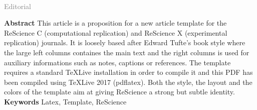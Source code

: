 \documentclass[a4paper,10pt]{article}
\makeatletter
\def\maketitle{{%
  \renewenvironment{tabular}[2][]
    {\begin{flushleft}}
    {\end{flushleft}}
  \AB@maketitle}}
\makeatother
\begin{document}
~\\
{\sf \large \textcolor{gray}{Editorial}}

{\let\newpage\relax\maketitle}
\maketitle

{\sf \bfseries Abstract} This article is a proposition for a new
article template for the ReScience C (computational replication) and ReScience
X (experimental replication) journals. It is loosely based after Edward Tufte's
book style where the large left columns containes the main text and the right
columns is used for auxiliary informations such as notes, captions or
references. The template requires a standard TeXLive installation in order to
compile it and this PDF has been compiled using TeXLive 2017 (pdflatex). Both
the style, the layout and the colors of the template aim at giving ReScience a
strong but subtle identity.\\

{\sf \bfseries Keywords} Latex, Template, ReScience\\



\vfill
\end{document}
